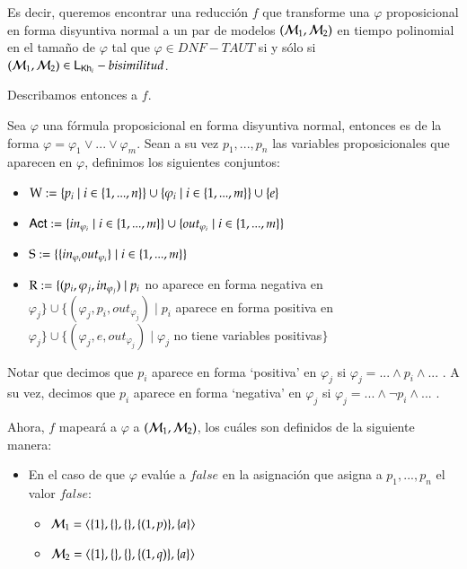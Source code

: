 \begin{demostracion}
    Es decir, queremos encontrar una reducción $f$ que transforme una $\varphi$ proposicional en forma disyuntiva normal a un par de modelos $(\modults_1,\modults_2)$ en tiempo polinomial en el tamaño de $\varphi$ tal que $\varphi \in DNF-TAUT$ si y sólo si $(\modults_1,\modults_2) \in \KHilogic-bisimilitud$.

    Describamos entonces a $f$.

    Sea $\varphi$ una fórmula proposicional en forma disyuntiva normal, entonces es de la forma $\varphi = \varphi_1 \vee ... \vee \varphi_m$. Sean a su vez $p_1,...,p_n$ las variables proposicionales que aparecen en $\varphi$, definimos los siguientes conjuntos:

    \begin{itemize}
        \item $\W := \{p_i\mid i\in\{1,...,n\}\} \cup \{\varphi_i \mid i \in \{1,...,m\}\} \cup \{e\}$
        \item $\ACT := \{in_{\varphi_i} \mid i \in \{1,...,m\}\} \cup \{out_{\varphi_i} \mid i \in \{1,...,m\}\}$
        \item $\S := \{\{in_{\varphi_i}out_{\varphi_i}\} \mid i \in \{1,...,m\}\}$
        \item $\R := \{(p_i,\varphi_j,in_{\varphi_j}) \mid p_i$ no aparece en forma negativa en $\varphi_j\} \cup \{(\varphi_j,p_i,out_{\varphi_j})\mid p_i$ aparece en forma positiva en $\varphi_j\} \cup \{(\varphi_j,e,out_{\varphi_j}) \mid \varphi_j$ no tiene variables positivas$\}$
    \end{itemize}

    Notar que decimos que $p_i$ aparece en forma `positiva' en $\varphi_j$ si $\varphi_j = ... \wedge p_i \wedge...$ . A su vez, decimos que $p_i$ aparece en forma `negativa' en $\varphi_j$ si $\varphi_j = ...\wedge \neg p_i \wedge...$ .

    Ahora, $f$ mapeará a $\varphi$ a $(\modults_1,\modults_2)$, los cuáles son definidos de la siguiente manera:

    \begin{itemize}
        \item En el caso de que $\varphi$ evalúe a $false$ en la asignación que asigna a $p_1,...,p_n$ el valor $false$:

        \begin{itemize}
            \item $\model_1=\tup{\{1\},\{\},\{\},\{(1,p)\},\{a\}}$
            \item $\model_2=\tup{\{1\},\{\},\{\},\{(1,q)\},\{a\}}$
        \end{itemize}


\end{itemize}
\end{demostracion}

